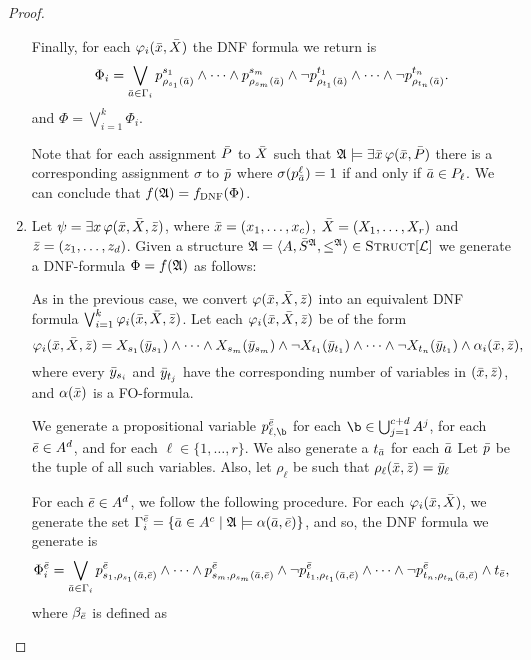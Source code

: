\begin{proof}
\begin{enumerate}
		Finally, for each $\varphi_i(\x,\X)$ the DNF formula we return is
		\[
		\Phi_i = \bigvee_{\a\in\Gamma_i} p^{s_1}_{\rho_{s_1}(\a)} \wedge \cdots \wedge p^{s_m}_{\rho_{s_m}(\a)} \wedge \neg p^{t_1}_{\rho_{t_1}(\a)} \wedge \cdots \wedge \neg p^{t_n}_{\rho_{t_n}(\a)}.
		\]
		and $\Phi = \bigvee_{i = 1}^k \Phi_i$.
		
		Note that for each assignment $\P$ to $\X$ such that $\A\models\exists\x\,\varphi(\x,\P)$ there is a corresponding assignment $\sigma$ to $\p$ where $\sigma(p^{\ell}_{\a}) = 1$ if and only if $\a\in P_{\ell}$. We can conclude that $f(\A) = f_{\textsc{DNF}}(\Phi)$.
		\item Let $\psi = \exists x\,\varphi(\x,\X,\z)$, where $\x = (x_1,\ldots,x_c)$, $\X = (X_1,\ldots,X_r)$ and $\z = (z_1,\ldots,z_d)$. Given a structure $\A = \langle A, \S^{\A}, \leq^{\A} \rangle\in\Truc$ we generate a DNF-formula $\Phi = f(\A)$ as follows:
		
		As in the previous case, we convert $\varphi(\x,\X,\z)$ into an equivalent DNF formula $\bigvee_{i = 1}^k \varphi_{i}(\x,\X,\z)$. Let each $\varphi_{i}(\x,\X,\z)$ be of the form
		\[
		\varphi_{i}(\x,\X,\z) = X_{s_1}(\y_{s_1}) \wedge \cdots \wedge X_{s_m}(\y_{s_m}) \wedge \neg X_{t_1}(\y_{t_1}) \wedge \cdots \wedge \neg X_{t_n}(\y_{t_1}) \wedge \alpha_i(\x,\z),
		\]
		where every $\y_{s_i}$ and $\y_{t_j}$ have the corresponding number of variables in $(\x,\z)$, and $\alpha(\x)$ is a FO-formula.
		
		We generate a propositional variable $p^{\e}_{\ell,\b}$ for each $\b\in \bigcup_{j = 1}^{c+d} A^j$, for each $\e\in A^d$, and for each $\ell\in\{1,\ldots,r\}$. We also generate a $t_{\a}$ for each $\a$ Let $\p$ be the tuple of all such variables. Also, let $\rho_{\ell}$ be such that $\rho_{\ell}(\x,\z) = \y_{\ell}$
		
		For each $\e\in A^d$, we follow the following procedure. For each $\varphi_i(\x,\X)$, we generate the set $\Gamma^{\e}_i = \{\a\in A^c\mid \A\models\alpha(\a,\e)\}$, and so, the DNF formula we generate is
		\[
		\Phi^{\e}_i = \bigvee_{\a\in\Gamma_i} p^{\e}_{s_1,\rho_{s_1}(\a,\e)} \wedge \cdots \wedge p^{\e}_{s_m,\rho_{s_m}(\a,\e)} \wedge \neg p^{\e}_{t_1,\rho_{t_1}(\a,\e)} \wedge \cdots \wedge \neg p^{\e}_{t_n,\rho_{t_n}(\a,\e)} \wedge t_{\e},
		\]
		where $\beta_{\e}$ is defined as

	\end{enumerate}
\end{proof}